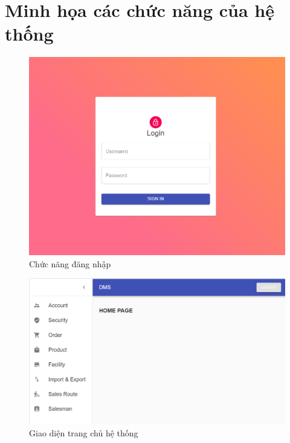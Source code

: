
\section{Minh họa các chức năng của hệ thống}
\begin{figure}[H]
\centering
\includegraphics[width=12cm]{images/demo/login.png}
\caption{Chức năng đăng nhập}
\end{figure}

\begin{figure}[H]
\centering
\includegraphics[width=15cm]{images/demo/home-page.png}
\caption{Giao diện trang chủ hệ thống}
\end{figure}

